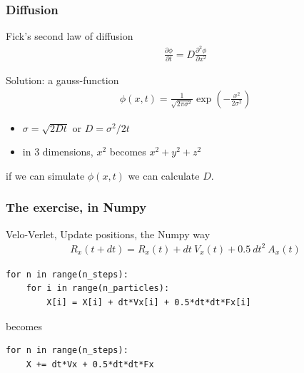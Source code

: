 \documentclass{beamer}
\begin{document}
\begin{frame}[fragile]

    \frametitle{Diffusion}

    Fick's second law of diffusion
    \begin{align*}
        \frac{\partial \phi }{\partial t} = D \frac{\partial^2 \phi }{\partial x^2}
    \end{align*}

    Solution: a gauss-function
    \begin{align*}
        \phi(x, t) = \frac{1}{\sqrt{2 \pi \sigma^2}} \exp \left (-\frac{x^2}{2 \sigma^2} \right )
    \end{align*}

    \begin{itemize}
        \item $\sigma = \sqrt{2 D t}$ or $D = \sigma^2/2t$
        \item in 3 dimensions, $x^2$ becomes $x^2 + y^2 + z^2$
    \end{itemize}

    if we can simulate $\phi(x,t)$ we can calculate $D$.

\end{frame}


\begin{frame}[fragile]

    \frametitle{The exercise, in Numpy}

    Velo-Verlet, Update positions, the Numpy way
    \begin{align*}
        R_x(t + dt) = R_x(t) + dt\ V_x(t) + 0.5\ dt^2\ A_x(t) \label{eq:position_x}
    \end{align*}


    \bigskip

\begin{lstlisting}
for n in range(n_steps):
    for i in range(n_particles):
        X[i] = X[i] + dt*Vx[i] + 0.5*dt*dt*Fx[i]
\end{lstlisting}

becomes

\begin{lstlisting}
for n in range(n_steps):
    X += dt*Vx + 0.5*dt*dt*Fx
\end{lstlisting}

\end{frame}






\end{document}
